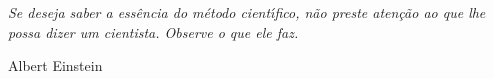 \vspace*{5.cm}
\begin{flushright}
\begin{minipage}{6.5cm}
\baselineskip=8pt
\textit{Se deseja saber a ess\^{e}ncia do m\'{e}todo cient\'{\i}fico, n\~{a}o preste aten\c{c}\~{a}o ao que lhe possa dizer um cientista. Observe o que ele faz.}
\medskip

\hfill {Albert Einstein}
\end{minipage}
\end{flushright}

%

%

\begin{flushleft}\protect
\tableofcontents\protect%
\end{flushleft}\protect

\vfill


\endinput
